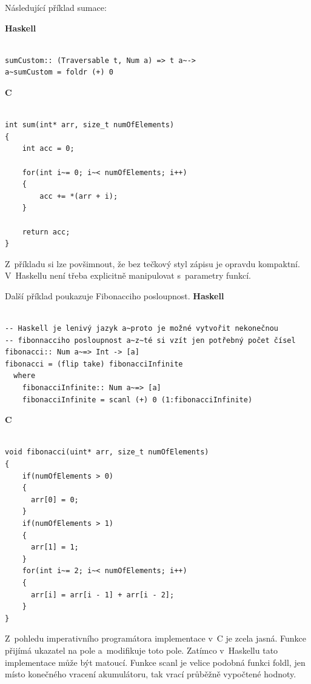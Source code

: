 \documentclass[male, czech]{kithesis}
\begin{document}
Následující příklad sumace:

\textbf{Haskell}
\begin{verbatim}

sumCustom:: (Traversable t, Num a) => t a~->
a~sumCustom = foldr (+) 0

\end{verbatim}

\textbf{C}
\begin{verbatim}

int sum(int* arr, size_t numOfElements)
{
    int acc = 0;
    
    for(int i~= 0; i~< numOfElements; i++)
    {
        acc += *(arr + i);
    }
    
    return acc;
}

\end{verbatim}
Z~příkladu si lze povšimnout, 
že bez tečkový styl zápisu je opravdu kompaktní. 
V~Haskellu není třeba explicitně manipulovat s~parametry funkcí.

Další příklad poukazuje Fibonacciho posloupnost.
\textbf{Haskell}
\begin{verbatim}

-- Haskell je lenivý jazyk a~proto je možné vytvořit nekonečnou 
-- fibonnacciho posloupnost a~z~té si vzít jen potřebný počet čísel 
fibonacci:: Num a~=> Int -> [a]
fibonacci = (flip take) fibonacciInfinite
  where
    fibonacciInfinite:: Num a~=> [a]
    fibonacciInfinite = scanl (+) 0 (1:fibonacciInfinite)

\end{verbatim}


\textbf{C}
\begin{verbatim}

void fibonacci(uint* arr, size_t numOfElements)
{
    if(numOfElements > 0)
    {
      arr[0] = 0;
    }
    if(numOfElements > 1)
    {
      arr[1] = 1;
    }
    for(int i~= 2; i~< numOfElements; i++)
    {
      arr[i] = arr[i - 1] + arr[i - 2];
    }
}

\end{verbatim}

Z~pohledu imperativního programátora implementace v~C je zcela jasná. 
Funkce přijímá ukazatel na pole a~modifikuje toto pole. 
Zatímco v~Haskellu tato implementace může být matoucí. 
Funkce scanl je velice podobná funkci foldl, 
jen místo konečného vracení akumulátoru, 
tak vrací průběžně vypočtené hodnoty.
\end{document}
